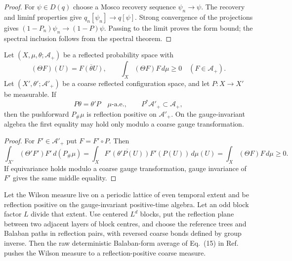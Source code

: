 \begin{proof}
For $\psi\in D(q)$ choose a Mosco recovery sequence $\psi_n\to\psi$.
The recovery and liminf properties give $q_n[\psi_n]\to q[\psi]$.
Strong convergence of the projections gives
$(1-P_n)\psi_n\to(1-P)\psi$.  Passing to the limit proves the form bound;
the spectral inclusion follows from the spectral theorem.
\end{proof}

\begin{proposition}
\label{prop:g19-rp-pushforward}
Let $(X,\mu,\theta;\mathcal A_+)$ be a reflected probability space with
\[
 (\Theta F)(U)=\overline{F(\theta U)},\qquad
 \int_X(\Theta F)F\,d\mu\ge0\quad(F\in\mathcal A_+).
\]
Let $(X',\theta';\mathcal A'_+)$ be a coarse reflected configuration space,
and let $P:X\to X'$ be measurable.  If
\begin{equation}
 P\theta=\theta'P\quad\mu\text{-a.e.},
 \qquad P^*\mathcal A'_+\subset\mathcal A_+,
 \label{eq:g19-rp-map}
\end{equation}
then the pushforward $P_\#\mu$ is reflection positive on
$\mathcal A'_+$.  On the gauge-invariant algebra the first equality may hold
only modulo a coarse gauge transformation.
\end{proposition}

\begin{proof}
For $F'\in\mathcal A'_+$ put $F=F'\circ P$.  Then
\[
 \int_{X'}(\Theta'F')F'\,d(P_\#\mu)
 =\int_X\overline{F'(\theta'P(U))}F'(P(U))\,d\mu(U)
 =\int_X(\Theta F)F\,d\mu\ge0.
\]
If equivariance holds modulo a coarse gauge transformation, gauge invariance
of $F'$ gives the same middle equality.
\end{proof}

\begin{corollary}
\label{cor:g19-balaban-rp}
Let the Wilson measure live on a periodic lattice of even temporal extent and
be reflection positive on the gauge-invariant positive-time algebra.  Let an
odd block factor $L$ divide that extent.  Use centered $L^d$ blocks, put the
reflection plane between two adjacent layers of block centres, and choose the
reference trees and Balaban paths in reflection pairs, with reversed coarse
bonds defined by group inverse.  Then the raw deterministic Balaban-form
average of Eq.~(15) in Ref.~\cite{Balaban1985Averaging} pushes the Wilson
measure to a reflection-positive coarse measure.
\end{corollary}

